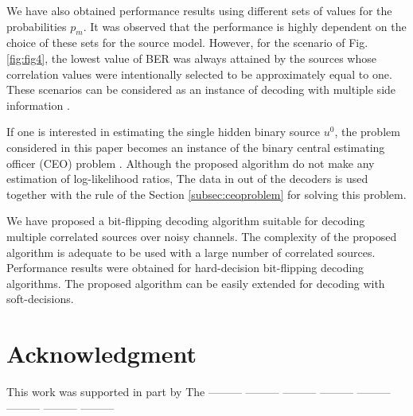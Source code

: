 \documentclass[journal]{IEEEtran}
\begin{document}

We have also obtained performance results 
using different sets of values for the probabilities $p_{m}$. It was 
observed that the performance is highly dependent on the choice of these sets 
for the source model.  However, for the scenario of Fig. \ref{fig:fig4}, the lowest value 
of BER was always attained by the sources whose correlation values were intentionally 
selected to be approximately equal to one. These scenarios can be considered as an instance 
of decoding with multiple side information \cite{side}.

If one is interested in estimating the single hidden binary source $u^{0}$, the problem 
considered in this paper becomes an instance of
the binary central estimating officer (CEO) problem \cite{binaryceo}.  Although the 
proposed algorithm do not make any estimation of log-likelihood ratios, 
The data in out of the decoders is used together with the rule 
of the Section \ref{subsec:ceoproblem} for solving this problem.

We have proposed a bit-flipping decoding algorithm suitable for decoding multiple 
correlated sources over noisy channels. The complexity of the proposed  algorithm 
is adequate to be used with a large number of correlated sources.  Performance results 
were obtained for hard-decision bit-flipping decoding algorithms. The proposed 
algorithm can be easily extended for decoding with soft-decisions.

\section*{Acknowledgment}
This work was supported in part by The --------- --------- --------- --------- 
---------  --------- --------- --------- %
\end{document}
